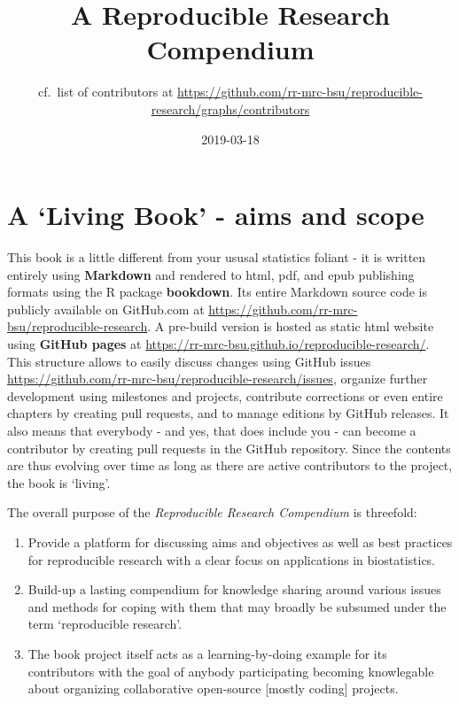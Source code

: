 \documentclass[]{book}
\title{A Reproducible Research Compendium}
\author{cf.~list of contributors at
\url{https://github.com/rr-mrc-bsu/reproducible-research/graphs/contributors}}
\date{2019-03-18}
\providecommand{\tightlist}{%
  \setlength{\itemsep}{0pt}\setlength{\parskip}{0pt}}
\begin{document}
\maketitle

{
\setcounter{tocdepth}{1}
\tableofcontents
}
\chapter{\texorpdfstring{A `Living Book' - aims and
scope}{A Living Book - aims and scope}}\label{a-living-book---aims-and-scope}

This book is a little different from your ususal statistics foliant - it
is written entirely using \textbf{Markdown} and rendered to html, pdf,
and epub publishing formats using the R package \textbf{bookdown}. Its
entire Markdown source code is publicly available on GitHub.com at
\url{https://github.com/rr-mrc-bsu/reproducible-research}. A pre-build
version is hosted as static html website using \textbf{GitHub pages} at
\url{https://rr-mrc-bsu.github.io/reproducible-research/}. This
structure allows to easily discuss changes using GitHub issues
\url{https://github.com/rr-mrc-bsu/reproducible-research/issues},
organize further development using milestones and projects, contribute
corrections or even entire chapters by creating pull requests, and to
manage editions by GitHub releases. It also means that everybody - and
yes, that does include you - can become a contributor by creating pull
requests in the GitHub repository. Since the contents are thus evolving
over time as long as there are active contributors to the project, the
book is `living'.

The overall purpose of the \emph{Reproducible Research Compendium} is
threefold:

\begin{enumerate}
\def\labelenumi{\arabic{enumi}.}
\tightlist
\item
  Provide a platform for discussing aims and objectives as well as best
  practices for reproducible research with a clear focus on applications
  in biostatistics.
\item
  Build-up a lasting compendium for knowledge sharing around various
  issues and methods for coping with them that may broadly be subsumed
  under the term `reproducible research'.
\item
  The book project itself acts as a learning-by-doing example for its
  contributors with the goal of anybody participating becoming
  knowlegable about organizing collaborative open-source {[}mostly
  coding{]} projects.
\end{enumerate}
\end{document}
